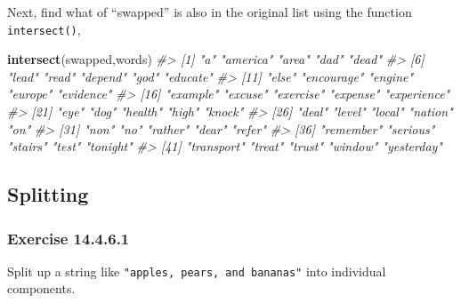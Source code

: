 \documentclass[]{book}
\newenvironment{Shaded}{\begin{snugshade}}{\end{snugshade}}
\newcommand{\CharTok}[1]{\textcolor[rgb]{0.31,0.60,0.02}{#1}}
\newcommand{\CommentTok}[1]{\textcolor[rgb]{0.56,0.35,0.01}{\textit{#1}}}
\newcommand{\KeywordTok}[1]{\textcolor[rgb]{0.13,0.29,0.53}{\textbf{#1}}}
\newcommand{\NormalTok}[1]{#1}
\newcommand{\StringTok}[1]{\textcolor[rgb]{0.31,0.60,0.02}{#1}}
\theoremstyle{plain}
\theoremstyle{remark}
\begin{document}
\begin{Shaded}
\end{Shaded}

Next, find what of ``swapped'' is also in the original list using the function \texttt{intersect()},

\begin{Shaded}
\begin{Highlighting}[]
\KeywordTok{intersect}\NormalTok{(swapped,words)}
\CommentTok{#>  [1] "a"          "america"    "area"       "dad"        "dead"      }
\CommentTok{#>  [6] "lead"       "read"       "depend"     "god"        "educate"   }
\CommentTok{#> [11] "else"       "encourage"  "engine"     "europe"     "evidence"  }
\CommentTok{#> [16] "example"    "excuse"     "exercise"   "expense"    "experience"}
\CommentTok{#> [21] "eye"        "dog"        "health"     "high"       "knock"     }
\CommentTok{#> [26] "deal"       "level"      "local"      "nation"     "on"        }
\CommentTok{#> [31] "non"        "no"         "rather"     "dear"       "refer"     }
\CommentTok{#> [36] "remember"   "serious"    "stairs"     "test"       "tonight"   }
\CommentTok{#> [41] "transport"  "treat"      "trust"      "window"     "yesterday"}
\end{Highlighting}
\end{Shaded}

\hypertarget{splitting}{%
\subsection{Splitting}\label{splitting}}

\hypertarget{exercise-14.4.6.1}{%
\subsubsection*{\texorpdfstring{Exercise {14.4.6.1}}{Exercise 14.4.6.1}}\label{exercise-14.4.6.1}}

Split up a string like \texttt{"apples,\ pears,\ and\ bananas"} into individual components.
\end{document}
